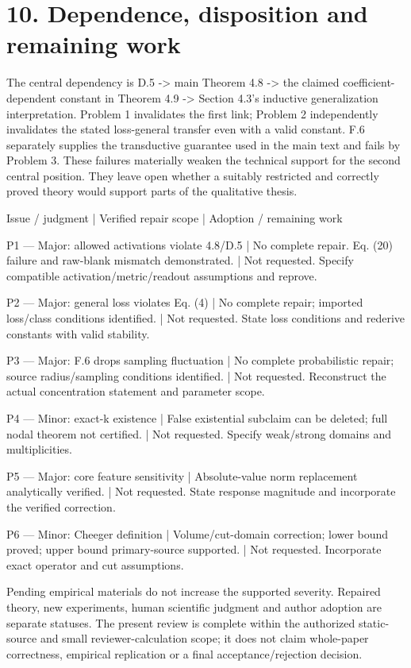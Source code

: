 \documentclass[10pt]{article}
\begin{document}
\section*{10. Dependence, disposition and remaining work}
The central dependency is D.5 -> main Theorem 4.8 -> the claimed coefficient-dependent constant in Theorem 4.9 -> Section 4.3’s inductive generalization interpretation. Problem 1 invalidates the first link; Problem 2 independently invalidates the stated loss-general transfer even with a valid constant. F.6 separately supplies the transductive guarantee used in the main text and fails by Problem 3. These failures materially weaken the technical support for the second central position. They leave open whether a suitably restricted and correctly proved theory would support parts of the qualitative thesis.\par
Issue / judgment | Verified repair scope | Adoption / remaining work\par
P1 — Major: allowed activations violate 4.8/D.5 | No complete repair. Eq. (20) failure and raw-blank mismatch demonstrated. | Not requested. Specify compatible activation/metric/readout assumptions and reprove.\par
P2 — Major: general loss violates Eq. (4) | No complete repair; imported loss/class conditions identified. | Not requested. State loss conditions and rederive constants with valid stability.\par
P3 — Major: F.6 drops sampling fluctuation | No complete probabilistic repair; source radius/sampling conditions identified. | Not requested. Reconstruct the actual concentration statement and parameter scope.\par
P4 — Minor: exact-k existence | False existential subclaim can be deleted; full nodal theorem not certified. | Not requested. Specify weak/strong domains and multiplicities.\par
P5 — Major: core feature sensitivity | Absolute-value norm replacement analytically verified. | Not requested. State response magnitude and incorporate the verified correction.\par
P6 — Minor: Cheeger definition | Volume/cut-domain correction; lower bound proved; upper bound primary-source supported. | Not requested. Incorporate exact operator and cut assumptions.\par
Pending empirical materials do not increase the supported severity. Repaired theory, new experiments, human scientific judgment and author adoption are separate statuses. The present review is complete within the authorized static-source and small reviewer-calculation scope; it does not claim whole-paper correctness, empirical replication or a final acceptance/rejection decision.\par
\end{document}
